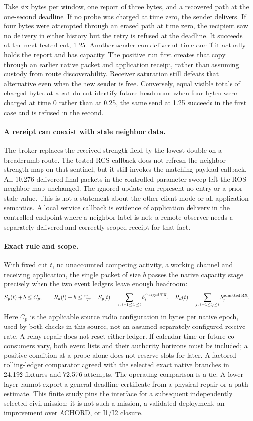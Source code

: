 \documentclass{article}
\begin{document}
Take six bytes per window, one report of three bytes, and a recovered path at the one-second deadline. If no probe was charged at time zero, the sender delivers. If four bytes were attempted through an erased path at time zero, the recipient saw no delivery in either history but the retry is refused at the deadline. It succeeds at the next tested cut, 1.25. Another sender can deliver at time one if it actually holds the report and has capacity. The positive run first creates that copy through an earlier native packet and application receipt, rather than assuming custody from route discoverability. Receiver saturation still defeats that alternative even when the new sender is free. Conversely, equal visible totals of charged bytes at a cut do not identify future headroom: when four bytes were charged at time 0 rather than at 0.25, the same send at 1.25 succeeds in the first case and is refused in the second.

\paragraph{A receipt can coexist with stale neighbor data.}
The broker replaces the received-strength field by the lowest double on a breadcrumb route. The tested ROS callback does not refresh the neighbor-strength map on that sentinel, but it still invokes the matching payload callback. All 10,276 delivered final packets in the controlled parameter sweep left the ROS neighbor map unchanged. The ignored update can represent no entry or a prior stale value. This is not a statement about the other client mode or all application semantics. A local service callback is evidence of application delivery in the controlled endpoint where a neighbor label is not; a remote observer needs a separately delivered and correctly scoped receipt for that fact.

\paragraph{Exact rule and scope.}
With fixed cut \(t\), no unaccounted competing activity, a working channel and receiving application, the single packet of size \(b\) passes the native capacity stage precisely when the two event ledgers leave enough headroom:
\[
 S_p(t)+b\le C_p,\qquad R_d(t)+b\le C_p,
 \quad S_p(t)=\sum_{i:\,t-1\le t_i\le t} b_i^{\rm charged\,TX},\quad
 R_d(t)=\sum_{j:\,t-1\le t_j\le t} b_j^{\rm admitted\,RX}.
\]
Here \(C_p\) is the applicable source radio configuration in bytes per native epoch, used by both checks in this source, not an assumed separately configured receive rate. A relay repair does not reset either ledger. If calendar time or future co-consumers vary, both event lists and their authority horizons must be included; a positive condition at a probe alone does not reserve slots for later. A factored rolling-ledger comparator agreed with the selected exact native branches in 24,192 fixtures and 72,576 attempts. The operating comparison is a tie. A lower layer cannot export a general deadline certificate from a physical repair or a path estimate. This finite study pins the interface for a subsequent independently selected civil mission; it is not such a mission, a validated deployment, an improvement over ACHORD, or I1/I2 closure.
\end{document}
